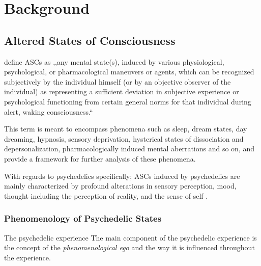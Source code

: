 \chapter{Background}
\vspace{-1.6em}
%

\minitoc
\thispagestyle{empty}
\newpage

\section{Altered States of Consciousness}\label{sec:asc_definition}
\textcite{ludwig1966altered} define \acp{ASC} as ,,any mental state(s), induced by various physiological, psychological, or pharmacological maneuvers or agents, which can be recognized subjectively by the individual himself (or by an objective observer of the individual) as representing a sufficient deviation in subjective experience or psychological functioning from certain general norms for that individual during alert, waking consciousness.``

This term is meant to encompass phenomena such as sleep, dream states, day dreaming, hypnosis, sensory deprivation, hysterical states of dissociation and depersonalization, pharmacologically induced mental aberrations and so on, and provide a framework for further analysis of these phenomena.

With regards to psychedelics specifically; \acp{ASC} induced by psychedelics are mainly characterized by profound alterations in sensory perception, mood, thought including the perception of reality, and the sense of self \autocite{preller2016phenomenology}.

\subsection{Phenomenology of Psychedelic States}
The psychedelic experience
The main component of the psychedelic experience is the concept of the \textit{phenomenological ego} and the way it is influenced throughout the experience.


